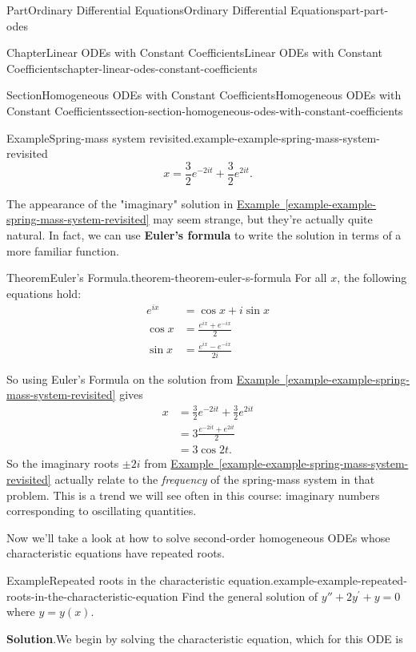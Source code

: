 \documentclass[twoside,10pt,]{book}
\newcommand{\blocktitlefont}{\relax}
\newcommand{\xreffont}{\relax}
\newcommand{\terminology}[1]{\textbf{#1}}
\numberwithin{equation}{part}
\begin{document}
\begin{partptx}{Part}{Ordinary Differential Equations}{}{Ordinary Differential Equations}{}{}{part-part-odes}
\begin{chapterptx}{Chapter}{Linear ODEs with Constant Coefficients}{}{Linear ODEs with Constant Coefficients}{}{}{chapter-linear-odes-constant-coefficients}
\begin{sectionptx}{Section}{Homogeneous ODEs with Constant Coefficients}{}{Homogeneous ODEs with Constant Coefficients}{}{}{section-section-homogeneous-odes-with-constant-coefficients}
\begin{example}{Example}{Spring-mass system revisited.}{example-example-spring-mass-system-revisited}
\begin{equation*}
x = \frac{3}{2}e^{-2it} + \frac{3}{2}e^{2it}.
\end{equation*}
%
\end{example}
The appearance of the "imaginary" solution in \hyperref[example-example-spring-mass-system-revisited]{Example~{\xreffont\ref{example-example-spring-mass-system-revisited}}} may seem strange, but they're actually quite natural. In fact, we can use \terminology{Euler's formula} to write the solution in terms of a more familiar function.%
\begin{theorem}{Theorem}{Euler's Formula.}{}{theorem-theorem-euler-s-formula}%
%
For all \(x\), the following equations hold:%
\begin{align*}
e^{ix} & = \cos x + i\sin x \\
\cos x & = \frac{e^{ix}+e^{-ix}}{2} \\
\sin x & = \frac{e^{ix} - e^{-ix}}{2i} 
\end{align*}
%
\end{theorem}
So using Euler's Formula on the solution from \hyperref[example-example-spring-mass-system-revisited]{Example~{\xreffont\ref{example-example-spring-mass-system-revisited}}} gives%
\begin{align*}
x & = \frac{3}{2}e^{-2it} + \frac{3}{2} e^{2it} \\
& = 3\frac{e^{-2it} + e^{2it}}{2} \\
& = 3\cos2t. 
\end{align*}
So the imaginary roots \(\pm2i\) from \hyperref[example-example-spring-mass-system-revisited]{Example~{\xreffont\ref{example-example-spring-mass-system-revisited}}} actually relate to the \emph{frequency} of the spring-mass system in that problem. This is a trend we will see often in this course: imaginary numbers corresponding to oscillating quantities.%
\par
Now we'll take a look at how to solve second-order homogeneous ODEs whose characteristic equations have repeated roots.%
\begin{example}{Example}{Repeated roots in the characteristic equation.}{example-example-repeated-roots-in-the-characteristic-equation}%
Find the general solution of \(y'' + 2y^\prime + y = 0\) where \(y = y(x)\).%
\par\smallskip%
\noindent\textbf{\blocktitlefont Solution}.\hypertarget{solution-example-repeated-roots-in-the-characteristic-equation-c}{}\quad{}We begin by solving the characteristic equation, which for this ODE is%
\begin{equation*}

\end{equation*}
\end{example}
\end{sectionptx}
\end{chapterptx}
\end{partptx}
\end{document}
